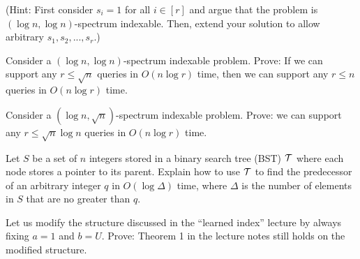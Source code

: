 \vgap

(Hint: First consider $s_i = 1$ for all $i \in [r]$ and argue that the problem is $(\log n, \log n)$-spectrum indexable. Then, extend your solution to allow arbitrary $s_1, s_2, ..., s_r$.)

 Consider a $(\log n, \log n)$-spectrum indexable problem. Prove: If we can support any $r \le \sqrt{n}$ queries in $O(n \log r)$ time, then we can support any $r \le n$ queries in $O(n \log r)$ time.

 Consider a $(\log n, \sqrt{n})$-spectrum indexable problem. Prove: we can support any $r \le \sqrt{n} \log n$ queries in $O(n \log r)$ time.

 Let $S$ be a set of $n$ integers stored in a binary search tree (BST) $\mathcal{T}$ where each node stores a pointer to its parent. Explain how to use $\mathcal{T}$ to find the predecessor of an arbitrary integer $q$ in $O(\log \Delta)$ time, where $\Delta$ is the number of elements in $S$ that are no greater than $q$.

 Let us modify the structure discussed in the ``learned index'' lecture by always fixing $a = 1$ and $b = U$. Prove: Theorem 1 in the lecture notes still holds on the modified structure.



